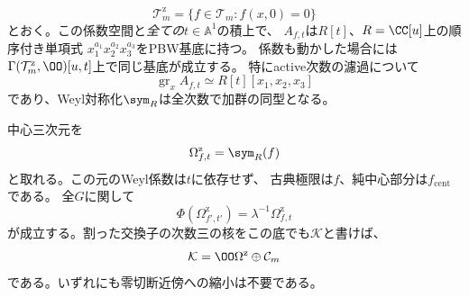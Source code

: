 \begin{theorem}[零制限における全パラメータの同変中心元]
\label{thm:pg-equivariant-zero-center}
\begin{equation}
 \mathcal T_m^{\mathrm z}
 =\{f\in\mathcal T_m:f(x,0)=0\}
 \label{eq:pg-equivariant-zero-base}
\end{equation}
とおく。この係数空間と\emph{全ての}$t\in\mathbb A^1$の積上で、
$A_{f,t}$は$R[t]$、$R=\CC[u]$上の順序付き単項式
$x_1^{a_1}x_2^{a_2}x_3^{a_3}$をPBW基底に持つ。
係数も動かした場合には$\Gamma(\mathcal T_m^{\mathrm z},\OO)[u,t]$上で同じ基底が成立する。
特にactive次数の濾過について
\begin{equation}
 \operatorname{gr}_x A_{f,t}\simeq R[t][x_1,x_2,x_3]
 \label{eq:pg-equivariant-zero-pbw}
\end{equation}
であり、Weyl対称化$\sym_R$は全次数で加群の同型となる。

中心三次元を
\begin{equation}
 \Omega^{\mathrm z}_{f,t}=\sym_R(f)
 \label{eq:pg-equivariant-zero-center}
\end{equation}
と取れる。この元のWeyl係数は$t$に依存せず、
古典極限は$f$、純中心部分は$f_{\mathrm{cent}}$である。
全$G$に関して
\begin{equation}
 \Phi(\Omega^{\mathrm z}_{f',t'})=\lambda^{-1}\Omega^{\mathrm z}_{f,t}
 \label{eq:pg-equivariant-zero-covariance}
\end{equation}
が成立する。割った交換子の次数三の核をこの底でも$\mathcal K$と書けば、
\begin{equation}
 \mathcal K=\OO\Omega^{\mathrm z}\oplus\mathcal C_m
 \label{eq:pg-equivariant-zero-kernel}
\end{equation}
である。いずれにも零切断近傍への縮小は不要である。
\end{theorem}
